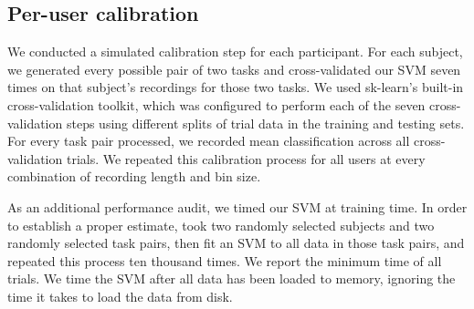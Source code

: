 \subsection{Per-user calibration}

We conducted a simulated calibration step for each participant. For each subject, we generated every possible pair of two tasks and cross-validated our SVM seven times on that subject's recordings for those two tasks. We used sk-learn's built-in cross-validation toolkit, which was configured to perform each of the seven cross-validation steps using different splits of trial data in the training and testing sets. For every task pair processed, we recorded mean classification across all cross-validation trials. We repeated this calibration process for all users at every combination of recording length and bin size. 


As an additional performance audit, we timed our SVM at training time. In order to establish a proper estimate, took two randomly selected subjects and two randomly selected task pairs, then fit an SVM to all data in those task pairs, and repeated this process ten thousand times. We report the minimum time of all trials. We time the SVM after all data has been loaded to memory, ignoring the time it takes to load the data from disk.


